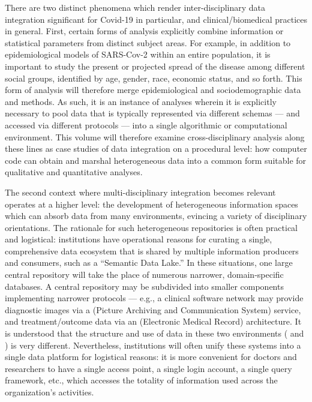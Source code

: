 \documentclass{statsoc}
\newcommand{\p}[1]{

\vspace{.75em}#1}
\newcommand{\textscc}[1]{{\color{orr!35!black}{{%
						\fontfamily{Cabin-TLF}\fontseries{b}\selectfont{\textsc{\scriptsize{#1}}}}}}}
\newcommand{\AcronymText}[1]{{\textscc{#1}}}
\newcommand{\q}[1]{{\fontfamily{qcr}\selectfont ``}#1{\fontfamily{qcr}\selectfont ''}}
\newcommand{\PACS}{\resizebox{!}{7pt}{\AcronymText{PACS}}}
\newcommand{\EMR}{\resizebox{!}{7pt}{\AcronymText{EMR}}}
\begin{document}
{\p{There are two distinct phenomena which render 
inter-disciplinary data integration significant for 
Covid-19 in particular, and clinical/biomedical practices 
in general.  First, certain forms of analysis explicitly 
combine information or statistical parameters from 
distinct subject areas.  For example, in addition 
to epidemiological models of SARS-Cov-2 within an 
entire population, it is important to study the 
present or projected spread of the disease among 
different social groups, identified by age, gender, 
race, economic status, and so forth.  This form 
of analysis will therefore merge epidemiological 
and sociodemographic data and methods.  As such, it is an 
instance of analyses wherein it is explicitly necessary 
to pool data that is typically represented 
via different schemas --- and accessed via different 
protocols --- into a single algorithmic or computational 
environment.  This volume will therefore 
examine cross-disciplinary analysis along these 
lines as case studies of data integration on a procedural 
level: how computer code can obtain and marshal heterogeneous 
data into a common form suitable for 
qualitative and quantitative analyses.} 
   
\p{The second context where multi-disciplinary integration 
becomes relevant operates at a higher level: the development 
of heterogeneous information spaces which can absorb 
data from many environments, evincing a variety of 
disciplinary orientations.  The rationale for such heterogeneous 
repositories is often practical and logistical: institutions 
have operational reasons for curating a single, comprehensive data ecosystem 
that is shared by multiple information producers and consumers, such as 
a \q{Semantic Data Lake.}  In these situations, one 
large central repository will take the place of numerous 
narrower, domain-specific databases.  A central repository 
may be subdivided into smaller components implementing 
narrower protocols --- e.g., a clinical software network may provide 
diagnostic images via a \PACS{} (Picture Archiving and Communication 
System) service, and treatment/outcome data via an 
\EMR{} (Electronic Medical Record) architecture.  It is understood 
that the structure and use of data in these two environments 
(\PACS{} and \EMR{}) is very different.  Nevertheless, 
institutions will often unify these systems into 
a single data platform for logistical reasons: it 
is more convenient for doctors and researchers to 
have a single access point, a single login account, 
a single query framework, etc., which accesses the 
totality of information used across the organization's 
activities.}

}
\end{document}
